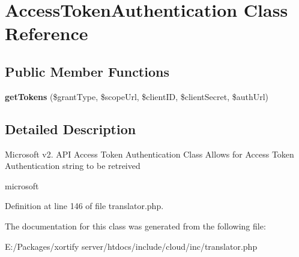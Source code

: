 \hypertarget{class_access_token_authentication}{\section{Access\-Token\-Authentication Class Reference}
\label{class_access_token_authentication}
}
\subsection*{Public Member Functions}
\begin{DoxyCompactItemize}
\item 
\hypertarget{class_access_token_authentication_ad73c919742685a07b7ae545236db4815}{{\bfseries get\-Tokens} (\$grant\-Type, \$scope\-Url, \$client\-I\-D, \$client\-Secret, \$auth\-Url)}\label{class_access_token_authentication_ad73c919742685a07b7ae545236db4815}

\end{DoxyCompactItemize}


\subsection{Detailed Description}
Microsoft v2. A\-P\-I Access Token Authentication Class Allows for Access Token Authentication string to be retreived

microsoft 

Definition at line 146 of file translator.\-php.



The documentation for this class was generated from the following file\-:\begin{DoxyCompactItemize}
\item 
E\-:/\-Packages/xortify server/htdocs/include/cloud/inc/translator.\-php\end{DoxyCompactItemize}
